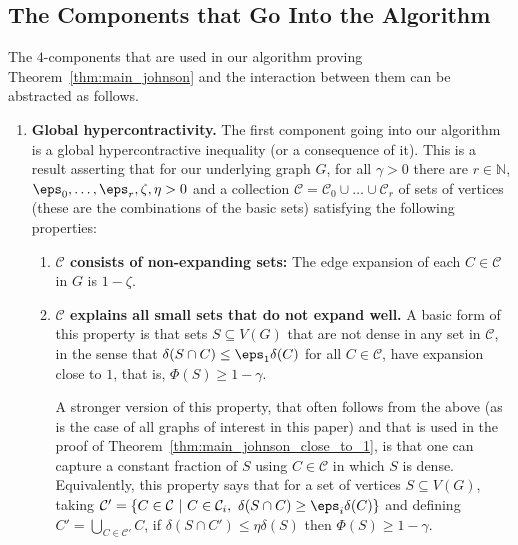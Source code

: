 \subsection{The Components that Go Into the Algorithm}\label{sec:abstraction}
The $4$-components that are used in 
our algorithm proving Theorem~\ref{thm:main_johnson} 
and the interaction between them can be abstracted as follows.
\begin{enumerate}
    \item \textbf{Global hypercontractivity.}\label{def:global-hypcont} 
    The first component going into our algorithm is a global hypercontractive inequality (or a consequence of it).
    This is a result asserting that 
    for our underlying graph $G$, for all $\gamma>0$ there are $r\in\mathbb{N}$, 
    $\eps_0,\ldots,\eps_r,\zeta,\eta>0$ and a collection 
    $\mathcal{C} = \mathcal{C}_0\cup\ldots\cup\mathcal{C}_r$ of sets of vertices (these are the combinations 
    of the basic sets) satisfying the following properties: 
    \begin{enumerate}
        \item 
        \textbf{$\mathcal{C}$ consists of non-expanding sets:} 
        The edge expansion of each $C\in\mathcal{C}$ in $G$ is $1-\zeta$.
        \item 
        \textbf{$\mathcal{C}$ explains all small sets that 
        do not expand well.} A basic form of this property 
        is that sets $S\subseteq V(G)$ that are not dense in 
        any set in $\mathcal{C}$, in the sense that $\delta(S\cap C)\leq \eps_1\delta(C)$
        for all $C\in\mathcal{C}$, have expansion close to $1$, that is, $\Phi(S)\geq 1-\gamma$.
        
        A stronger version of this property, that often follows from the above (as is the case of all graphs of interest in this paper) and that is used in the proof of Theorem~\ref{thm:main_johnson_close_to_1}, is that 
        one can capture a constant fraction of $S$ using $C\in\mathcal{C}$ in which $S$ is dense. 
        Equivalently, this property says that for a set of vertices $S\subseteq V(G)$, taking $\mathcal{C}' = \{C\in\mathcal{C}~|~C\in\mathcal{C}_i,~\delta(S\cap C)\geq \eps_i \delta(C)\}$ and defining $C' = \bigcup_{C\in \mathcal{C}'}C$, if $\delta(S\cap C')\leq \eta \delta(S)$ then
        $\Phi(S)\geq 1-\gamma$.
        

\end{enumerate}
\end{enumerate}
